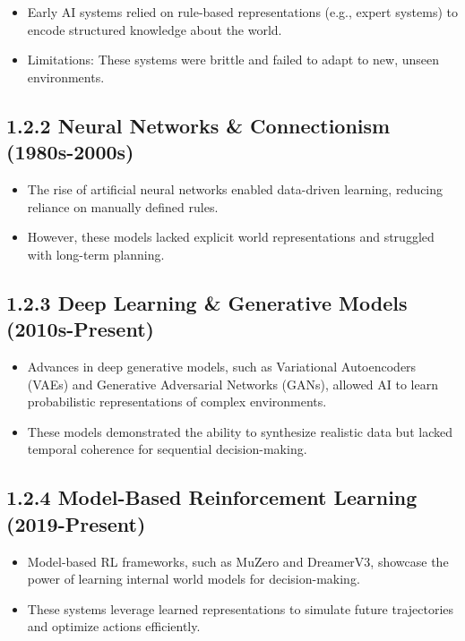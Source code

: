 \documentclass[
]{book}
\providecommand{\tightlist}{%
  \setlength{\itemsep}{0pt}\setlength{\parskip}{0pt}}
\begin{document}
\begin{itemize}
\tightlist
\item
  Early AI systems relied on rule-based representations (e.g., expert systems) to encode structured knowledge about the world.
\item
  Limitations: These systems were brittle and failed to adapt to new, unseen environments.
\end{itemize}

\subsection{1.2.2 Neural Networks \& Connectionism (1980s-2000s)}\label{neural-networks-connectionism-1980s-2000s}

\begin{itemize}
\tightlist
\item
  The rise of artificial neural networks enabled data-driven learning, reducing reliance on manually defined rules.
\item
  However, these models lacked explicit world representations and struggled with long-term planning.
\end{itemize}

\subsection{1.2.3 Deep Learning \& Generative Models (2010s-Present)}\label{deep-learning-generative-models-2010s-present}

\begin{itemize}
\tightlist
\item
  Advances in deep generative models, such as Variational Autoencoders (VAEs) and Generative Adversarial Networks (GANs), allowed AI to learn probabilistic representations of complex environments.
\item
  These models demonstrated the ability to synthesize realistic data but lacked temporal coherence for sequential decision-making.
\end{itemize}

\subsection{1.2.4 Model-Based Reinforcement Learning (2019-Present)}\label{model-based-reinforcement-learning-2019-present}

\begin{itemize}
\tightlist
\item
  Model-based RL frameworks, such as MuZero and DreamerV3, showcase the power of learning internal world models for decision-making.
\item
  These systems leverage learned representations to simulate future trajectories and optimize actions efficiently.
\end{itemize}
\end{document}
